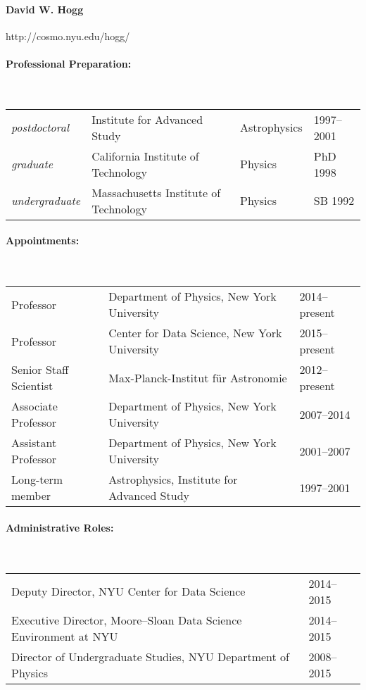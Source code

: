 \documentclass[letterpaper,12pt]{article}
\begin{document}
\paragraph{David W. Hogg} http://cosmo.nyu.edu/hogg/

\paragraph{Professional Preparation:}~\\[3pt]
\begin{tabular}{llll}
\textsl{postdoctoral}
  & Institute for Advanced Study          & Astrophysics & 1997--2001\\
\textsl{graduate}
  & California Institute of Technology    & Physics & PhD 1998\\
\textsl{undergraduate}
  & Massachusetts Institute of Technology & Physics & SB 1992\\
\end{tabular}
           
\paragraph{Appointments:}~\\[3pt]
\begin{tabular}{lll}
Professor           & Department of Physics, New York University & 2014--present \\
Professor           & Center for Data Science, New York University & 2015--present \\
Senior Staff Scientist & Max-Planck-Institut f\"ur Astronomie    & 2012--present \\
Associate Professor & Department of Physics, New York University & 2007--2014 \\
Assistant Professor & Department of Physics, New York University & 2001--2007 \\
Long-term member    & Astrophysics, Institute for Advanced Study & 1997--2001 \\
\end{tabular}

\paragraph{Administrative Roles:}~\\[3pt]
\begin{tabular}{ll}
Deputy Director, NYU Center for Data Science & 2014--2015 \\
Executive Director, Moore--Sloan Data Science Environment at NYU & 2014--2015 \\
Director of Undergraduate Studies, NYU Department of Physics & 2008--2015 \\
\end{tabular}
\end{document}

